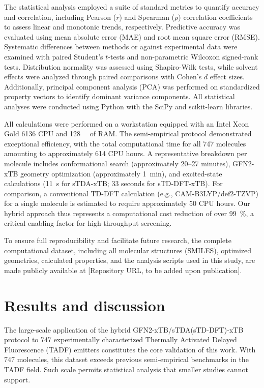 \documentclass[journal=jcisd8,manuscript=article,keywords=true]{achemso}
\begin{document}
The statistical analysis employed a suite of standard metrics to quantify accuracy and
correlation, including Pearson ($r$) and Spearman ($\rho$) correlation coefficients to
assess linear and monotonic trends, respectively. Predictive accuracy was evaluated using
mean absolute error (MAE) and root mean square error (RMSE). Systematic differences
between methods or against experimental data were examined with paired Student's $t$-tests
and non-parametric Wilcoxon signed-rank tests. Distribution normality was assessed using
Shapiro-Wilk tests, while solvent effects were analyzed through paired comparisons with
Cohen's $d$ effect sizes. Additionally, principal component analysis (PCA) was performed
on standardized property vectors to identify dominant variance components. All statistical
analyses were conducted using Python with the SciPy and scikit-learn libraries.

All calculations were performed on a workstation equipped with an Intel Xeon Gold 6136 CPU
and \qty{128}{\giga\byte} of RAM. The semi-empirical protocol demonstrated exceptional
efficiency, with the total computational time for all \num{747} molecules amounting to
approximately \num{614} CPU hours. A representative breakdown per molecule includes
conformational search (approximately 20–27 minutes), GFN2-xTB geometry optimization
(approximately \qty{1}{\minute}), and excited-state calculations (\qty{11}{\second} for
sTDA-xTB; 33 seconds for sTD-DFT-xTB). For comparison, a conventional TD-DFT calculation
(e.g., CAM-B3LYP/def2-TZVP) for a single molecule is estimated to require approximately 50
CPU hours. Our hybrid approach thus represents a computational cost reduction of over
\qty{99}{\percent}, a critical enabling factor for high-throughput screening.

To ensure full reproducibility and facilitate future research, the complete computational dataset, including all molecular structures (SMILES), optimized geometries, calculated properties, and the analysis scripts used in this study, are made publicly available at [Repository URL, to be added upon publication].


\section{Results and discussion}\label{sec:Res_Disc}

The large-scale application of the hybrid GFN2-xTB/sTDA(sTD-DFT)-xTB protocol to \num{747} experimentally characterized Thermally Activated Delayed Fluorescence (TADF) emitters constitutes the core validation of this work. With 747 molecules, this dataset exceeds previous semi-empirical benchmarks in the TADF field. Such scale permits statistical analysis that smaller studies cannot support.
\end{document}
